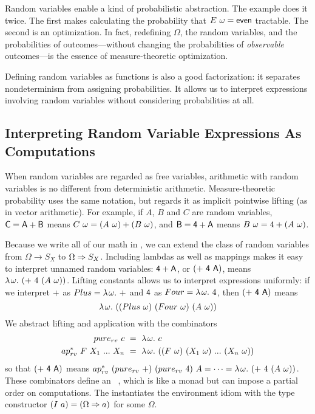 Random variables enable a kind of probabilistic abstraction. The example does it twice. The first makes calculating the probability that ${E}\ {\omega} = \mathsf{even}$ tractable. The second is an optimization. In fact, redefining $\Omega$, the random variables, and the probabilities of outcomes---without changing the probabilities of \textit{observable} outcomes---is the essence of measure-theoretic optimization.

Defining random variables as functions is also a good factorization: it separates nondeterminism from assigning probabilities. It allows us to interpret expressions involving random variables without considering probabilities at all.

\subsection{Interpreting Random Variable Expressions As Computations}

When random variables are regarded as free variables, arithmetic with random variables is no different from deterministic arithmetic. Measure-theoretic probability uses the same notation, but regards it as implicit pointwise lifting (as in vector arithmetic). For example, if $A$, $B$ and $C$ are random variables, $\mathsf{C = A + B}$ means ${C}\ {\omega} = \left({A}\ {\omega}\right) + \left({B}\ {\omega}\right)$, and $\mathsf{B = 4 + A}$ means ${B}\ {\omega} = 4 + \left({A}\ {\omega}\right)$.

Because we write all of our math in \targetlang, we can extend the class of random variables from $\Omega \to S_X$ to $\Omega \Rightarrow S_X$. Including lambdas as well as mappings makes it easy to interpret unnamed random variables: $\mathsf{4 + A}$, or $\mathsf{\left({+}\ {4}\ {A}\right)}$, means $\lambda\mspace{2mu}{\omega}\ldotp\, {\left({+}\ {4}\ {\left({A}\ {\omega}\right)}\right)}$. Lifting constants allows us to interpret expressions uniformly: if we interpret $\mathsf{+}$ as $Plus = \lambda\mspace{2mu}{\omega}\ldotp\, +$ and $\mathsf{4}$ as ${Four = \lambda\mspace{2mu}{\omega}\ldotp\, 4}$, then $\mathsf{\left({+}\ {4}\ {A}\right)}$ means
\begin{equation}
	\lambda\mspace{2mu}{\omega}\ldotp\, {\left({\left({Plus}\ {\omega}\right)}\ {\left({Four}\ {\omega}\right)}\ {\left({A}\ {\omega}\right)}\right)}
\end{equation}
We abstract lifting and application with the combinators
\begin{equation}
\begin{split}
	\app \purerv c &\ =\  \fun \omega c \\
	\appppp \applyrv F {X_1} \dots {X_n} &\ =\ 
		\fun \omega {\papppp {\papp F \omega} {\papp {X_1} \omega} \dots {\papp {X_n} \omega}}
\end{split}
\end{equation}
so that $\mathsf{\left({+}\ {4}\ {A}\right)}$ means ${ap^*_{rv}}\ {\left({pure_{rv}}\ {+}\right)}\ {\left({pure_{rv}}\ {4}\right)}\ {A} = \cdots = \lambda\mspace{2mu}{\omega}\ldotp\, {\left({+}\ {4}\ {\left({A}\ {\omega}\right)}\right)}$. These combinators define an ~\cite{cit:mcbride-2008jfp-idiom}, which is like a monad but can impose a partial order on computations. The  instantiates the environment idiom with the type constructor $\left({I}\ {a}\right) = (\Omega \Rightarrow a)$ for some $\Omega$.

